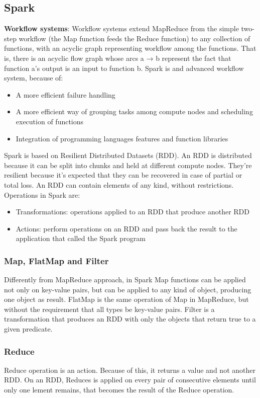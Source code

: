 \documentclass[\main/main.tex]{subfiles}
\begin{document}
\subsection{Spark}
\textbf{Workflow systems}: Workflow systems extend MapReduce from the simple two-step workflow (the Map function feeds the Reduce function) to any collection of functions, with an acyclic graph representing workflow among the functions. That is, there is an acyclic flow graph whose arcs a → b represent the fact that function a’s output is an input to function b. \cite{leskovec_rajaraman_ullman_2020}
Spark is and advanced workflow system, because of:
\begin{itemize}
    \item A more efficient failure handling
    \item A more efficient way of grouping tasks among compute nodes and scheduling execution of functions
    \item Integration of programming languages features and function libraries
\end{itemize}
Spark is based on Resilient Distributed Datasets (RDD). An RDD is distributed because it can be split into chunks and held at different compute nodes. They're resilient because it's expected that they can be recovered in case of partial or total loss. An RDD can contain elements of any kind, without restrictions.
Operations in Spark are:
\begin{itemize}
    \item Transformations: operations applied to an RDD that produce another RDD
    \item Actions: perform operations on an RDD and pass back the result to the application that called the Spark program
\end{itemize}
\subsubsection{Map, FlatMap and Filter}
Differently from MapReduce approach, in Spark Map functions can be applied not only on key-value pairs, but can be applied to any kind of object, producing one object as result. 
FlatMap is the same operation of Map in MapReduce, but without the requirement that all types be key-value pairs. Filter is a transformation that produces an RDD with only the objects that return true to a given predicate.
\subsubsection{Reduce}
Reduce operation is an action. Because of this, it returns a value and not another RDD. On an RDD, Reduces is applied on every pair of consecutive elements until only one lement remains, that becomes the result of the Reduce operation.
\end{document}
